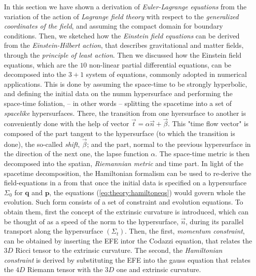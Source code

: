 {    %
    In this section we have shown a derivation of \textit{Euler-Lagrange equations} from the variation of the action of \textit{Lagrange field theory} with respect to the \textit{generalized coordinates of the field}, and assuming the compact domain for boundary conditions.
    Then, we sketched how the \textit{Einstein field equations} can be derived from the \textit{Einstein-Hilbert action}, that describes gravitational and matter fields, through the \textit{principle of least action}.
    Then we discussed how the Einstein field equations, which are the $10$ non-linear partial differential equations, can be decomposed into the $3+1$ system of equations, commonly adopted in numerical applications.
    This is done by assuming the space-time to be strongly hyperbolic, and defining the initial data on the numm hypersurface and performing the space-time foliation, -- in other words -- splitting the spacetime into a set of \textit{spacelike} hypersurfaces.
    There, the transition from one hyersurface to another is conveniently done with the help of vector $\vec{t} = \alpha\vec{n}+\vec{\beta}$. This "time flow vector" is composed of the part tangent to the hypersurface (to which the transition is done), the so-called \textit{shift}, $\vec{\beta}$; and the part, normal to the previous hypersurface in the direction of the next one, the lapse function $\alpha$. 
    The space-time metric is then decomposed into the spatian, \textit{Riemannian metric} and time part.
    In light of the spacetime decomposition, the Hamiltonian formalism can be used to re-derive the field-equations in a from that once the initial data is specified on a hypersurface $\Sigma_0$ for $\boldsymbol{q}$ and $\boldsymbol{p}$, the equations (\ref{eq:theory:hamiltoneqs}) would govern whole the evolution. 
    Such form consists of a set of constraint and evolution equations.
    To obtain them, first the concept of the extrinsic curvature is introduced, which can be thought of as a speed of the norm to the hypersurface, $\vec{n}$, during its parallel transport along the hypersurface $(\Sigma_t)$.
    Then, the first, \textit{momentum constraint}, can be obtained by inserting the EFE intor the Codazzi equation, that relates the $3D$ Ricci tensor to the extrinsic curvature. 
    The second, the \textit{Hamiltonian constraint} is derived by substituting the EFE into the gauss equation that relates the $4D$ Riemann tensor with the $3D$ one and extrinsic curvature.
}
